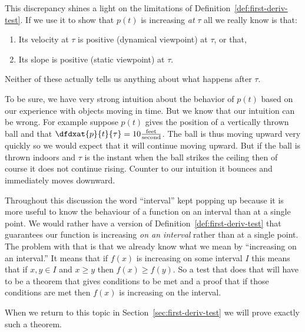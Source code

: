 \begin{Digression}
This discrepancy shines a light on the limitations of
Definition~\ref{def:first-deriv-test}. If we use it to show that
$p(t)$ is increasing \emph{at} $\tau$ all we really know is that:
\begin{enumerate}
\item Its velocity at $\tau$ is positive (dynamical viewpoint)
  \alert{at $\tau$}, or that,
\item Its slope is positive (static viewpoint) \alert{at $\tau$}.
\end{enumerate}
Neither of these actually tells
us anything about what happens  \alert{after} $\tau$.

To be sure, we have very strong intuition about the behavior of $p(t)$
based on our experience with objects moving in time. But we know that our intuition
can be wrong. For example suppose $p(t)$ gives the position of a
vertically thrown ball and that $\dfdxat{p}{t}{\tau}=10
\frac{\text{feet}}{\text{second}}$. The ball is thus moving upward
very quickly so we would expect that it will continue moving
upward. But if the ball is thrown indoors and $\tau$ is the instant
when the ball strikes the ceiling then of course it does not continue
rising. Counter to our intuition it bounces and immediately moves
downward.

Throughout this discussion the word ``interval'' kept popping up
because it is more useful to know the behaviour of a function on an
interval than at a single point.  We would rather have a version of
Definition~\ref{def:first-deriv-test} that guarantees our function is
increasing \emph{on an interval} rather than at a single point. The
problem with that is that we already know what we mean by ``increasing
on an interval.'' It means that if $f(x)$ is increasing on some
interval $I$ this means that if $x, y\in I$ and $x\ge y$ then
$f(x)\ge f(y).$ So a test that does that will have to be a theorem
that gives conditions to be met and a proof that if those conditions
are met then $f(x)$ is increasing on the interval.

When we return to this topic in Section~\ref{sec:first-deriv-test} we
will prove exactly such a theorem.
\end{Digression}

